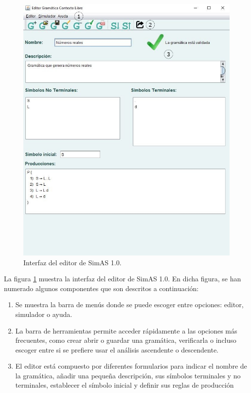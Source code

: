  \begin{figure}[!t]
 	\begin{center}
      \includegraphics[scale=0.5]{figuras/Cap3/interfaz.JPG} 
       \caption{Interfaz del editor de SimAS 1.0.}\label{fig:SimAS-1.0-editor}
 	\end{center}
 \end{figure}


La figura \ref{fig:SimAS-1.0-editor} muestra la interfaz del editor de SimAS 1.0. En dicha figura, se han numerado algunos componentes que son descritos a continuación:
 \begin{enumerate}
     \item Se muestra la barra de menús donde se puede escoger entre opciones: editor, simulador o ayuda.
     \item La barra de herramientas permite acceder rápidamente a las opciones más frecuentes, como crear abrir o guardar una gramática, verificarla o incluso escoger entre si se prefiere usar el análisis ascendente o descendente.
     \item El editor está compuesto por diferentes formularios para indicar el nombre de la gramática, añadir una pequeña descripción, sus  símbolos terminales y no terminales, establecer el símbolo inicial y definir sus reglas de producción
 \end{enumerate}



